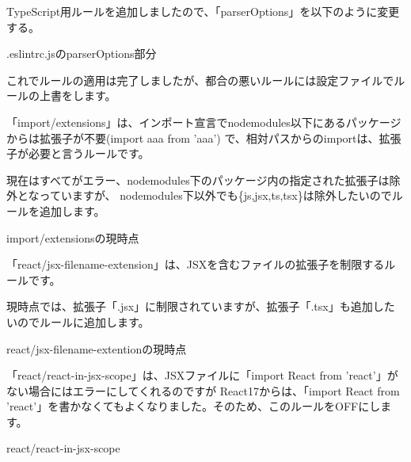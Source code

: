 TypeScript用ルールを追加しましたので、「parserOptions」を以下のように変更する。

\def\startercodeblockfontsize{}
\begin{starterprogram}[]{.eslintrc.jsのparserOptions部分}\end{starterprogram}

これでルールの適用は完了しましたが、都合の悪いルールには設定ファイルでルールの上書をします。

「import/extensions」は、インポート宣言でnode\textunderscore{}modules以下にあるパッケージからは拡張子が不要(import aaa from 'aaa')
で、相対パスからのimportは、拡張子が必要と言うルールです。

現在はすべてがエラー、node\textunderscore{}modules下のパッケージ内の指定された拡張子は除外となっていますが、
node\textunderscore{}modules下以外でも\{js,jsx,ts,tsx\}は除外したいのでルールを追加します。

\def\startercodeblockfontsize{}
\begin{starterprogram}[]{import/extensionsの現時点}\end{starterprogram}

「react/jsx{-}filename{-}extension」は、JSXを含むファイルの拡張子を制限するルールです。

現時点では、拡張子「.jsx」に制限されていますが、拡張子「.tsx」も追加したいのでルールに追加します。

\def\startercodeblockfontsize{}
\begin{starterprogram}[]{react/jsx{-}filename{-}extentionの現時点}\end{starterprogram}

「react/react{-}in{-}jsx{-}scope」は、JSXファイルに「import React from 'react'」がない場合にはエラーにしてくれるのですが
React17からは、「import React from 'react'」を書かなくてもよくなりました。そのため、このルールをOFFにします。

\def\startercodeblockfontsize{}
\begin{starterprogram}[]{react/react{-}in{-}jsx{-}scope}\end{starterprogram}


